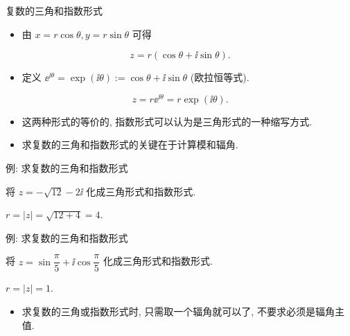 \begin{frame}{复数的三角和指数形式}
	\begin{itemize}
		\item 由 $x=r\cos\theta,y=r\sin\theta$ 可得
	\end{itemize}
	\onslide<+->
	\begin{definition*}[][复数的三角形式]
	\[
		z=r(\cos\theta+\ii\sin\theta).
	\]
	\end{definition*}
	\begin{itemize}
		\item 定义 \alert{$\ee^{\ii\theta}=\exp(\ii\theta):=\cos\theta+\ii\sin\theta$} (欧拉恒等式).
	\end{itemize}
	\onslide<+->
	\begin{definition*}[][复数的指数形式]
	\[
		z=r\ee^{\ii\theta}=r\exp(\ii\theta).
	\]
	\end{definition*}
	\begin{itemize}
		\item 这两种形式的等价的, 指数形式可以认为是三角形式的一种缩写方式.
		\item 求复数的三角和指数形式的\alert{关键在于计算模和辐角}.
	\end{itemize}
\end{frame}


\begin{frame}{例: 求复数的三角和指数形式}
	\onslide<+->
	\begin{example}[nearnext]
		将 $z=-\sqrt{12}-2\ii$ 化成三角形式和指数形式.
	\end{example}
	\onslide<+->
	\begin{solution}[nearprev]
		$r=|z|=\sqrt{12+4}=4$.
		\onslide<+->{%
		故
		\[
			z=4\left[\cos\Bigl(-\frac{5\pi}6\Bigr)+\ii\sin\Bigl(-
			\frac{5\pi}6\Bigr)\right]=4\ee^{-\frac{5\pi\ii}6}.
		\]
		}
	\end{solution}
\end{frame}


\begin{frame}{例: 求复数的三角和指数形式}
	\beqskip{6pt}
	\onslide<+->
	\begin{example}[nearnext]
		将 $z=\sin\dfrac\pi5+\ii\cos\dfrac\pi5$ 化成三角形式和指数形式.
	\end{example}
	\onslide<+->
	\begin{solution}[near]
		$r=|z|=1$.
		\onslide<+->{%
		\[
			z=\cos\frac{3\pi}{10}+\ii\sin\frac{3\pi}{10}=\ee^{\frac{3\pi\ii}{10}}.
		\]}
		\bigdel
	\end{solution}
	\begin{itemize}
		\item 求复数的三角或指数形式时, 只需取一个辐角就可以了, 不要求必须是辐角主值.
	\end{itemize}
	\endgroup
\end{frame}


